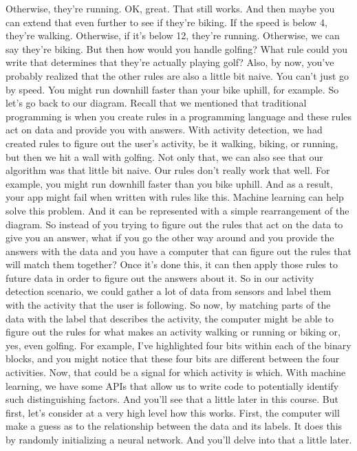 Otherwise, they're running.
OK, great.
That still works.
And then maybe you can extend that even further to see if they're biking.
If the speed is below 4, they're walking.
Otherwise, if it's below 12, they're running.
Otherwise, we can say they're biking.
But then how would you handle golfing?
What rule could you write that determines
that they're actually playing golf?
Also, by now, you've probably realized that the other rules are also
a little bit naive.
You can't just go by speed.
You might run downhill faster than your bike uphill, for example.
So let's go back to our diagram.
Recall that we mentioned that traditional programming is
when you create rules in a programming language and these rules act on data
and provide you with answers.
With activity detection, we had created rules
to figure out the user's activity, be it walking, biking, or running,
but then we hit a wall with golfing.
Not only that, we can also see that our algorithm was that little bit naive.
Our rules don't really work that well.
For example, you might run downhill faster than you bike uphill.
And as a result, your app might fail when written with rules like this.
Machine learning can help solve this problem.
And it can be represented with a simple rearrangement of the diagram.
So instead of you trying to figure out the rules that act on the data
to give you an answer, what if you go the other way around
and you provide the answers with the data
and you have a computer that can figure out the rules that
will match them together?
Once it's done this, it can then apply those rules to future data
in order to figure out the answers about it.
So in our activity detection scenario, we could gather a lot of data
from sensors and label them with the activity that the user is following.
So now, by matching parts of the data with the label that
describes the activity, the computer might
be able to figure out the rules for what makes an activity walking or running
or biking or, yes, even golfing.
For example, I've highlighted four bits within each of the binary blocks,
and you might notice that these four bits are
different between the four activities.
Now, that could be a signal for which activity is which.
With machine learning, we have some APIs that
allow us to write code to potentially identify such distinguishing factors.
And you'll see that a little later in this course.
But first, let's consider at a very high level how this works.
First, the computer will make a guess as to the relationship
between the data and its labels.
It does this by randomly initializing a neural network.
And you'll delve into that a little later.
